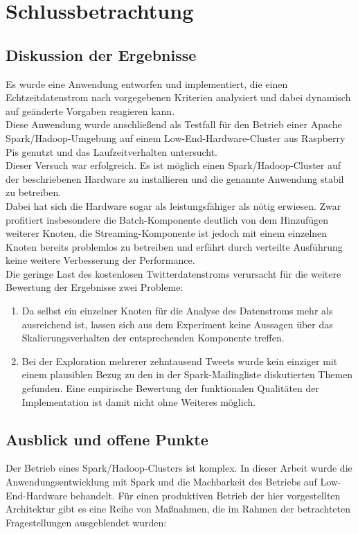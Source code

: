 \chapter{Schlussbetrachtung}
\section{Diskussion der Ergebnisse}
Es wurde eine Anwendung entworfen und implementiert, die einen Echtzeitdatenstrom nach vorgegebenen Kriterien analysiert und dabei dynamisch auf geänderte Vorgaben reagieren kann.\\
Diese Anwendung wurde anschließend als Testfall für den Betrieb einer Apache Spark/Hadoop-Umgebung auf einem Low-End-Hardware-Cluster aus Raspberry Pis genutzt und das Laufzeitverhalten untersucht.\\

Dieser Versuch war erfolgreich. Es ist möglich einen Spark/Hadoop-Cluster auf der beschriebenen Hardware zu installieren und die genannte Anwendung stabil zu betreiben.\\

Dabei hat sich die Hardware sogar als leistungsfähiger als nötig erwiesen. Zwar profitiert insbesondere die Batch-Komponente deutlich von dem Hinzufügen weiterer Knoten, die Streaming-Komponente ist jedoch mit einem einzelnen Knoten bereits problemlos zu betreiben und erfährt durch verteilte Ausführung keine weitere Verbesserung der Performance.\\

Die geringe Last des kostenlosen Twitterdatenstroms verursacht für die weitere Bewertung der Ergebnisse zwei Probleme:
\begin{enumerate}
	\item Da selbst ein einzelner Knoten für die Analyse des Datenstroms mehr als ausreichend ist, lassen sich aus dem Experiment keine Aussagen über das Skalierungsverhalten der entsprechenden Komponente treffen.
	\item Bei der Exploration mehrerer zehntausend Tweets wurde kein einziger mit einem plausiblen Bezug zu den in der Spark-Mailingliste diskutierten Themen gefunden. Eine empirische Bewertung der funktionalen Qualitäten der Implementation ist damit nicht ohne Weiteres möglich.
\end{enumerate}

\section{Ausblick und offene Punkte}
Der Betrieb eines Spark/Hadoop-Clusters ist komplex. In dieser Arbeit wurde die Anwendungsentwicklung mit Spark und die Machbarkeit des Betriebs auf Low-End-Hardware behandelt. Für einen produktiven Betrieb der hier vorgestellten Architektur gibt es eine Reihe von Maßnahmen, die im Rahmen der betrachteten Fragestellungen ausgeblendet wurden:\\

